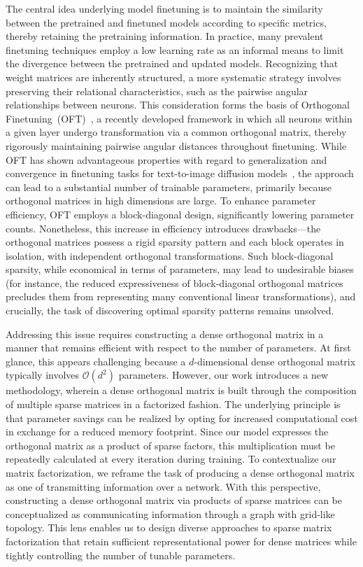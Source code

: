 The central idea underlying model finetuning is to maintain the similarity between the pretrained and finetuned models according to specific metrics, thereby retaining the pretraining information. In practice, many prevalent finetuning techniques employ a low learning rate as an informal means to limit the divergence between the pretrained and updated models. Recognizing that weight matrices are inherently structured, a more systematic strategy involves preserving their relational characteristics, such as the pairwise angular relationships between neurons. This consideration forms the basis of Orthogonal Finetuning~(OFT)~\cite{qiu2023controlling}, a recently developed framework in which all neurons within a given layer undergo transformation via a common orthogonal matrix, thereby rigorously maintaining pairwise angular distances throughout finetuning. While OFT has shown advantageous properties with regard to generalization and convergence in finetuning tasks for text-to-image diffusion models~\cite{qiu2023controlling}, the approach can lead to a substantial number of trainable parameters, primarily because orthogonal matrices in high dimensions are large. To enhance parameter efficiency, OFT employs a block-diagonal design, significantly lowering parameter counts. Nonetheless, this increase in efficiency introduces drawbacks—the orthogonal matrices possess a rigid sparsity pattern and each block operates in isolation, with independent orthogonal transformations. Such block-diagonal sparsity, while economical in terms of parameters, may lead to undesirable biases (for instance, the reduced expressiveness of block-diagonal orthogonal matrices precludes them from representing many conventional linear transformations), and crucially, the task of discovering optimal sparsity patterns remains unsolved.

Addressing this issue requires constructing a dense orthogonal matrix in a manner that remains efficient with respect to the number of parameters. At first glance, this appears challenging because a $d$-dimensional dense orthogonal matrix typically involves $\mathcal{O}(d^2)$ parameters. However, our work introduces a new methodology, wherein a dense orthogonal matrix is built through the composition of multiple sparse matrices in a factorized fashion. The underlying principle is that parameter savings can be realized by opting for increased computational cost in exchange for a reduced memory footprint. Since our model expresses the orthogonal matrix as a product of sparse factors, this multiplication must be repeatedly calculated at every iteration during training. To contextualize our matrix factorization, we reframe the task of producing a dense orthogonal matrix as one of transmitting information over a network. With this perspective, constructing a dense orthogonal matrix via products of sparse matrices can be conceptualized as communicating information through a graph with grid-like topology. This lens enables us to design diverse approaches to sparse matrix factorization that retain sufficient representational power for dense matrices while tightly controlling the number of tunable parameters.

